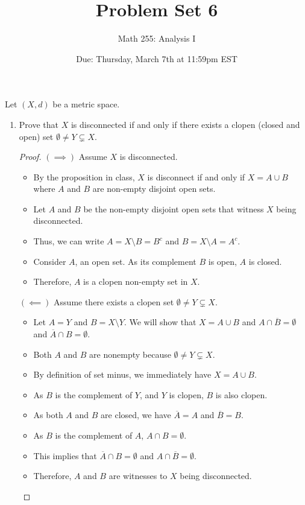 \documentclass[10pt]{article}
\newenvironment{problem}[2][Problem]{\begin{trivlist}
\item[\hskip \labelsep {\bfseries #1}\hskip \labelsep {\bfseries #2.}]}{\end{trivlist}}
\begin{document}
\title{Problem Set 6}
\author{Math 255: Analysis I}
\date{Due: Thursday, March 7th at 11:59pm EST}

\maketitle

\begin{problem}{1} 
	Let $ (X,d) $ be a metric space.
	\begin{enumerate}
		\item Prove that $ X $ is disconnected if and only if there exists a clopen (closed and open) set $ \emptyset \neq Y \subsetneq X $.
            \begin{proof}
                $(\implies)$ Assume $X$ is disconnected.
                \begin{itemize}
                    \item By the proposition in class, $X$ is disconnect if and only if $X = A \cup B$ where $A$ and $B$ are non-empty disjoint open sets.
                    \item Let $A$ and $B$ be the non-empty disjoint open sets that witness $X$ being disconnected.
                    \item Thus, we can write $A = X \setminus B = B^c$ and $B = X \setminus A = A^c$.
                    \item Consider $A$, an open set. As its complement $B$ is open, $A$ is closed.
                    \item Therefore, $A$ is a clopen non-empty set in $X$.
                \end{itemize}

                $(\impliedby)$ Assume there exists a clopen set $ \emptyset \neq Y \subsetneq X $.
                \begin{itemize}
                    \item Let $A = Y$ and $B = X \setminus Y$. We will show that $X = A \cup B$ and $A \cap \overline{B} = \emptyset$ and $\overline{A} \cap B = \emptyset$.
                    \item Both $A$ and $B$ are nonempty because $\emptyset \neq Y \subsetneq X$.
                    \item By definition of set minus, we immediately have $X = A \cup B$.
                    \item As $B$ is the complement of $Y$, and $Y$ is clopen, $B$ is also clopen.
                    \item As both $A$ and $B$ are closed, we have $\overline{A} = A$ and $\overline{B} = B$.
                    \item As $B$ is the complement of $A$, $A \cap B = \emptyset$.
                    \item This implies that $\overline{A} \cap B = \emptyset$ and $A \cap \overline{B} = \emptyset$.
                    \item Therefore, $A$ and $B$ are witnesses to $X$ being disconnected.
                \end{itemize}


\end{proof}
\end{enumerate}
\end{problem}
\end{document}
